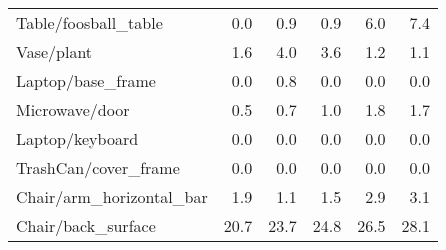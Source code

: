 \begin{table}[!h]
\begin{tabular}{lrrrrr}
Table/foosball\_table           &            0.0 &             0.9 &                     0.9 &           6.0 &                   7.4 \\
Vase/plant                     &            1.6 &             4.0 &                     3.6 &           1.2 &                   1.1 \\
Laptop/base\_frame              &            0.0 &             0.8 &                     0.0 &           0.0 &                   0.0 \\
Microwave/door                 &            0.5 &             0.7 &                     1.0 &           1.8 &                   1.7 \\
Laptop/keyboard                &            0.0 &             0.0 &                     0.0 &           0.0 &                   0.0 \\
TrashCan/cover\_frame           &            0.0 &             0.0 &                     0.0 &           0.0 &                   0.0 \\
Chair/arm\_horizontal\_bar       &            1.9 &             1.1 &                     1.5 &           2.9 &                   3.1 \\
Chair/back\_surface             &           20.7 &            23.7 &                    24.8 &          26.5 &                  28.1 \\
\bottomrule
\end{tabular}
\end{table}

